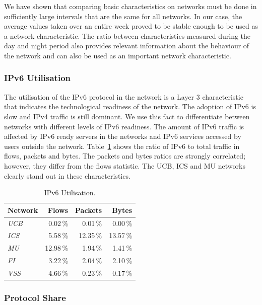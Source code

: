 We have shown that comparing basic characteristics on networks must be done in sufficiently large intervals that are the same for all networks. In our case, the average values taken over an entire week proved to be stable enough to be used as a network characteristic. The ratio between characteristics measured during the day and night period also provides relevant information about the behaviour of the network and can also be used as an important network characteristic.


\subsubsection{IPv6 Utilisation}

The utilisation of the IPv6 protocol in the network is a Layer 3 characteristic that indicates the technological readiness of the network. The adoption of IPv6 is slow and IPv4 traffic is still dominant. We use this fact to differentiate between networks with different levels of IPv6 readiness. The amount of IPv6 traffic is affected by IPv6 ready servers in the networks and IPv6 services accessed by users outside the network. Table~\ref{tab:characterization-ipv6-utilization} shows the ratio of IPv6 to total traffic in flows, packets and bytes. The packets and bytes ratios are strongly correlated; however, they differ from the flows statistic. The UCB, ICS and MU networks clearly stand out in these characteristics.

\begin{table}[!t]
        \centering
        \renewcommand{\arraystretch}{1.1}
        \begin{tabular}{|l|r|r|r|} \hline
 \textbf{Network} & \textbf{Flows} & \textbf{Packets} & \textbf{Bytes} \\ \hline
 \textit{UCB} & 0.02\,\% & 0.01\,\% & 0.00\,\% \\ \hline
 \textit{ICS} & 5.58\,\% & 12.35\,\% & 13.57\,\% \\ \hline
 \textit{MU} & 12.98\,\% & 1.94\,\% & 1.41\,\% \\ \hline
 \textit{FI} & 3.22\,\% & 2.04\,\% & 2.10\,\% \\ \hline
 \textit{VSS} & 4.66\,\% & 0.23\,\% & 0.17\,\% \\ \hline
        \end{tabular}
        \caption{IPv6 Utilisation.}
        \label{tab:characterization-ipv6-utilization}
\end{table}


\subsubsection{Protocol Share}

